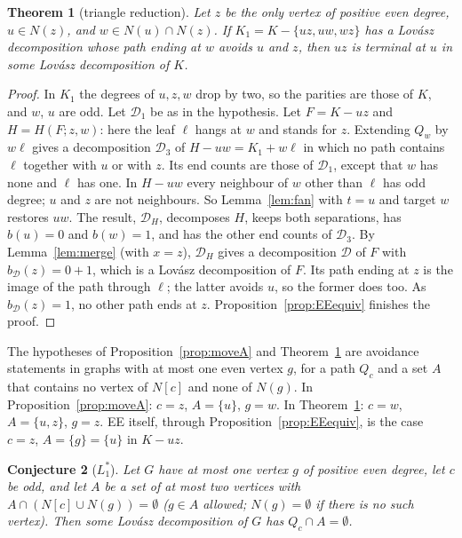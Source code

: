 \documentclass[11pt]{amsart}
\newtheorem{theorem}{Theorem}[section]
\newtheorem{conjecture}[theorem]{Conjecture}
\theoremstyle{definition}
\newcommand{\cD}{\mathcal D}
\begin{document}
\begin{theorem}[triangle reduction]\label{thm:triangle}
Let $z$ be the only vertex of positive even degree, $u\in N(z)$, and $w\in N(u)\cap N(z)$. If
$K_1=K-\{uz,uw,wz\}$ has a Lov\'asz decomposition whose path ending at $w$ avoids $u$ and $z$, then
$uz$ is terminal at $u$ in some Lov\'asz decomposition of $K$.
\end{theorem}

\begin{proof}
In $K_1$ the degrees of $u,z,w$ drop by two, so the parities are those of $K$, and $w$, $u$ are odd.
Let $\cD_1$ be as in the hypothesis. Let $F=K-uz$ and $H=H(F;z,w)$: here the leaf $\ell$ hangs at $w$
and stands for $z$. Extending $Q_w$ by $w\ell$ gives a decomposition $\cD_3$ of $H-uw=K_1+w\ell$ in
which no path contains $\ell$ together with $u$ or with $z$. Its end counts are those of $\cD_1$,
except that $w$ has none and $\ell$ has one. In $H-uw$ every neighbour of $w$ other than $\ell$ has odd
degree; $u$ and $z$ are not neighbours. So Lemma~\ref{lem:fan} with $t=u$ and target $w$ restores $uw$.
The result, $\cD_H$, decomposes $H$, keeps both separations, has $b(u)=0$ and $b(w)=1$, and has the
other end counts of $\cD_3$. By Lemma~\ref{lem:merge} (with $x=z$), $\cD_H$ gives a decomposition $\cD$
of $F$ with $b_\cD(z)=0+1$, which is a Lov\'asz decomposition of $F$. Its path ending at $z$ is the
image of the path through $\ell$; the latter avoids $u$, so the former does too. As $b_\cD(z)=1$, no
other path ends at $z$. Proposition~\ref{prop:EEequiv} finishes the proof.
\end{proof}

The hypotheses of Proposition~\ref{prop:moveA} and Theorem~\ref{thm:triangle} are avoidance statements
in graphs with at most one even vertex $g$, for a path $Q_c$ and a set $A$ that contains no vertex of
$N[c]$ and none of $N(g)$. In Proposition~\ref{prop:moveA}: $c=z$, $A=\{u\}$, $g=w$. In
Theorem~\ref{thm:triangle}: $c=w$, $A=\{u,z\}$, $g=z$. EE itself, through
Proposition~\ref{prop:EEequiv}, is the case $c=z$, $A=\{g\}=\{u\}$ in $K-uz$.

\begin{conjecture}[$L_1^*$]\label{conj:L1star}
Let $G$ have at most one vertex $g$ of positive even degree, let $c$ be odd, and let $A$ be a set of at
most two vertices with $A\cap(N[c]\cup N(g))=\emptyset$ ($g\in A$ allowed; $N(g)=\emptyset$ if there
is no such vertex). Then some Lov\'asz
decomposition of $G$ has $Q_c\cap A=\emptyset$.
\end{conjecture}
\end{document}
